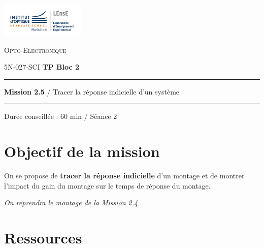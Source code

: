 \newpage
\pagestyle{empty}

\begin{minipage}[c]{.25\linewidth}
	\includegraphics[width=4cm]{images/Logo-LEnsE.png}
\end{minipage} \hfill
\begin{minipage}[c]{.4\linewidth}

\begin{center}
\vspace{0.3cm}
{\Large \textsc{Opto-Electronique}}

\medskip

5N-027-SCI \qquad \textbf{\Large TP Bloc 2}

\end{center}
\end{minipage}\hfill

\vspace{0.5cm}

\noindent \rule{\linewidth}{1pt}

{\noindent\Large \textbf{Mission 2.5} / Tracer la réponse indicielle d'un système} 

\noindent \rule{\linewidth}{1pt}

\vspace{-0.5cm}

\begin{center}

Durée conseillée : 60 min / Séance 2

\end{center}

\section{Objectif de la mission}
\label{mission25}

On se propose de \textbf{tracer la réponse indicielle} d'un montage et de montrer l'impact du gain du montage sur le temps de réponse du montage.

\textit{On reprendra le montage de la Mission 2.4.}


\section{Ressources}

